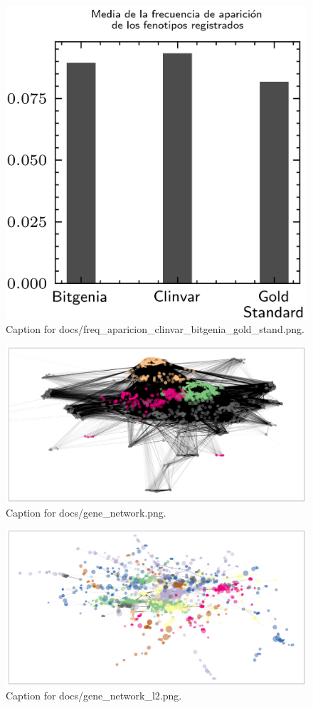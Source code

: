 \documentclass{article}
\begin{document}
\begin{figure}[h] \centering \includegraphics{docs/freq_aparicion_clinvar_bitgenia_gold_stand.png} \caption{Caption for docs/freq_aparicion_clinvar_bitgenia_gold_stand.png.} \end{figure}
\begin{figure}[h] \centering \includegraphics{docs/gene_network.png} \caption{Caption for docs/gene_network.png.} \end{figure}
\begin{figure}[h] \centering \includegraphics{docs/gene_network_l2.png} \caption{Caption for docs/gene_network_l2.png.} \end{figure}
\end{document}
